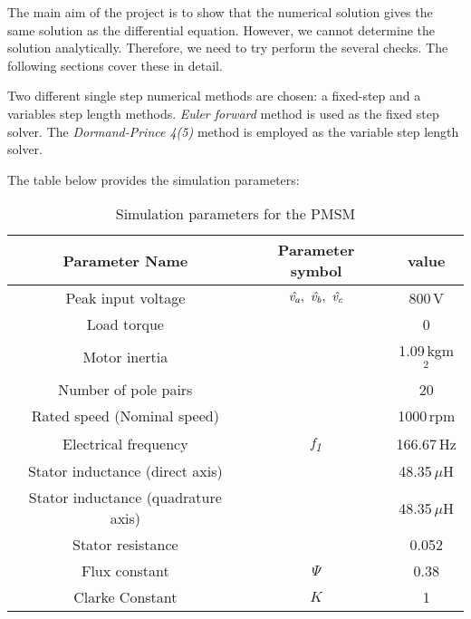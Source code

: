 The main aim of the project is to show that the numerical solution gives the same solution as the differential equation. However, we cannot determine the solution analytically. Therefore, we need to try perform the several checks. The following sections cover these in detail. 

Two different single step numerical methods are chosen: a fixed-step and a variables step length methods. \textit{Euler forward} method is used as the fixed step solver. The \textit{Dormand-Prince 4(5)} method is employed as the variable step length solver.

The table  below provides the simulation parameters:
\begin{table}[h!b!]
	\centering
	\begin{tabular}{c|c|c}
		Parameter Name & Parameter symbol & value \\
		\hline
		Peak input voltage & $\hat \va,\ \hat \vb,\ \hat \vc $ & 800\,V\\
		Load torque & \Tl & 0\\
		Motor inertia & \J & 1.09\,kgm$^2$\\
		Number of pole pairs & \np & 20\\
		Rated speed (Nominal speed) & \Nrnom & 1000\,rpm \\
		Electrical frequency & \textit{f\textsubscript{1}} & 166.67\,Hz\\
		Stator inductance (direct axis)& \Ld & 48.35\,$\mu$H\\
		Stator inductance (quadrature axis)& \Ld & 48.35\,$\mu$H\\
		Stator resistance & \Rs & 0.052 \\
		Flux constant & $\Psi$ & 0.38 \\
		Clarke Constant & $K$ & 1
	\end{tabular}
	\caption{Simulation parameters for the PMSM}
	\label{tab:simparam}
\end{table}

